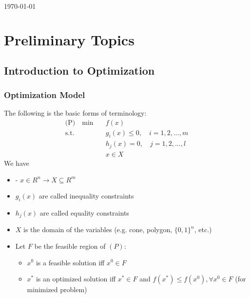

	\maketitle
	\today

	\clearpage
	\thispagestyle{plain}
	\par{}

	\tableofcontents

	\part{Preliminary Topics}\label{PT}
		\chapter{Introduction to Optimization}
			\section{Optimization Model}
				The following is the basic forms of terminology:
				\begin{align}
					\text{(P)} \quad \min \quad & f(x)  \\
								\text{s.t.} \quad & g_i(x)\le 0, \quad i=1,2,...,m \\
											& h_j(x)=0, \quad j=1,2,...,l \\
											& x \in X 
				\end{align}
				We have
				\begin{itemize}
					\item - $x\in R^n \rightarrow X \subseteq R^m$
					\item $g_i(x)$ are called inequality constraints
					\item $h_j(x)$ are called equality constraints
					\item $X$ is the domain of the variables (e.g. cone, polygon, $\{0, 1\}^n$, etc.)
					\item Let $F$ be the feasible region of $(P)$:
					\begin{itemize}
						\item $x^0$ is a feasible solution iff $x^0\in F$
						\item $x^*$ is an optimized solution iff $x^* \in F$ and $f(x^*)\le f(x^0), \forall x^0 \in F$ (for minimized problem)
					\end{itemize}
				\end{itemize}

